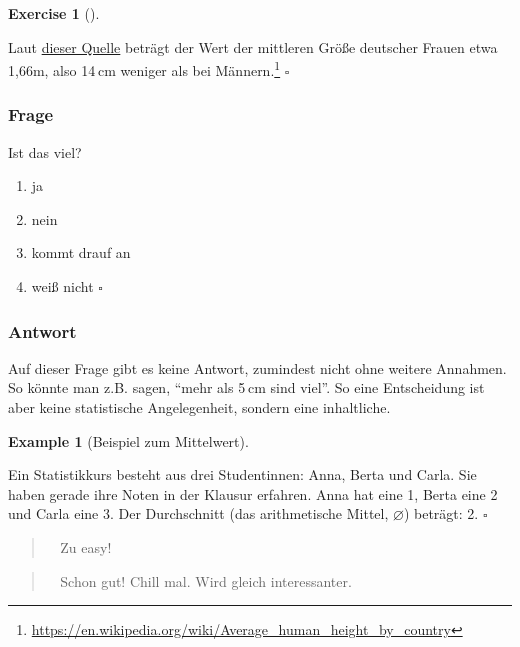 \documentclass[
  letterpaper,
  DIV=11,
  numbers=noendperiod]{scrartcl}
\providecommand{\tightlist}{%
  \setlength{\itemsep}{0pt}\setlength{\parskip}{0pt}}\usepackage{longtable,booktabs,array}
\theoremstyle{definition}
\newtheorem{example}{Example}[section]
\theoremstyle{definition}
\newtheorem{exercise}{Exercise}[section]
\theoremstyle{definition}
\theoremstyle{remark}
\begin{document}
\begin{exercise}[]\protect\hypertarget{exr-mw2}{}\label{exr-mw2}

Laut
\href{https://en.wikipedia.org/wiki/Average_human_height_by_country}{dieser
Quelle} beträgt der Wert der mittleren Größe deutscher Frauen etwa
1,66m, also 14 cm weniger als bei Männern.\footnote{\url{https://en.wikipedia.org/wiki/Average_human_height_by_country}}
\(\square\)

\end{exercise}

\subsubsection{Frage}

Ist das viel?

\begin{enumerate}
\def\labelenumi{\alph{enumi})}
\tightlist
\item
  ja
\item
  nein
\item
  kommt drauf an
\item
  weiß nicht \(\square\)
\end{enumerate}

\subsubsection{Antwort}

Auf dieser Frage gibt es keine Antwort, zumindest nicht ohne weitere
Annahmen. So könnte man z.B. sagen, ``mehr als 5 cm sind viel''. So eine
Entscheidung ist aber keine statistische Angelegenheit, sondern eine
inhaltliche.

\begin{example}[Beispiel zum
Mittelwert]\protect\hypertarget{exm-mw}{}\label{exm-mw}

Ein Statistikkurs besteht aus drei Studentinnen: Anna, Berta und Carla.
Sie haben gerade ihre Noten in der Klausur erfahren. Anna hat eine 1,
Berta eine 2 und Carla eine 3. Der Durchschnitt (das arithmetische
Mittel, \(\varnothing\)) beträgt: 2. \(\square\)

\end{example}

\begin{quote}
🧑‍🎓 Zu easy!
\end{quote}

\begin{quote}
👨‍🏫 Schon gut! Chill mal. Wird gleich interessanter.
\end{quote}
\end{document}
